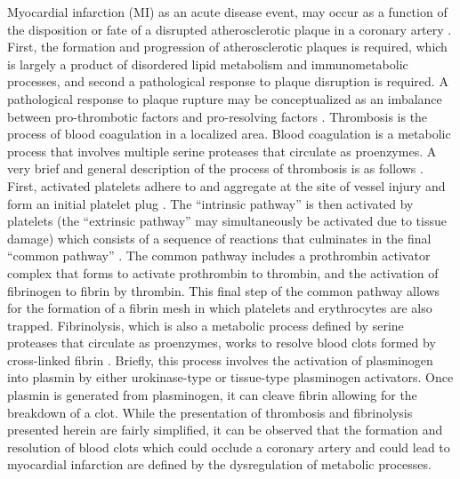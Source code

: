 \begin{DoubleSpace*}
Myocardial infarction (MI) as an acute disease event, may occur as a function of the disposition or fate of a disrupted atherosclerotic plaque in a coronary artery \cite{arbab2015}. First, the formation and progression of atherosclerotic plaques is required, which is largely a product of disordered lipid metabolism and immunometabolic processes, and second a pathological response to plaque disruption is required. A pathological response to plaque rupture may be conceptualized as an imbalance between pro-thrombotic factors and pro-resolving factors \cite{arbab2015}. Thrombosis is the process of blood coagulation in a localized area. Blood coagulation is a metabolic process that involves multiple serine proteases that circulate as proenzymes. A very brief and general description of the process of thrombosis is as follows \cite{baynes2014,gale2010,hoffman2007}. First, activated platelets adhere to and aggregate at the site of vessel injury and form an initial platelet plug \cite{gale2010}. The ``intrinsic pathway'' is then activated by platelets (the ``extrinsic pathway'' may simultaneously be activated due to tissue damage) which consists of a sequence of reactions that culminates in the final ``common pathway'' \cite{hoffman2007}. The common pathway includes a prothrombin activator complex that forms to activate prothrombin to thrombin, and the activation of fibrinogen to fibrin by thrombin. This final step of the common pathway allows for the formation of a fibrin mesh in which platelets and erythrocytes are also trapped. Fibrinolysis, which is also a metabolic process defined by serine proteases that circulate as proenzymes, works to resolve blood clots formed by cross-linked fibrin \cite{gale2010}. Briefly, this process involves the activation of plasminogen into plasmin by either urokinase-type or tissue-type plasminogen activators. Once plasmin is generated from plasminogen, it can cleave fibrin allowing for the breakdown of a clot. While the presentation of thrombosis and fibrinolysis presented herein are fairly simplified, it can be observed that the formation and resolution of blood clots which could occlude a coronary artery and could lead to myocardial infarction are defined by the dysregulation of metabolic processes. 


\end{DoubleSpace*}
